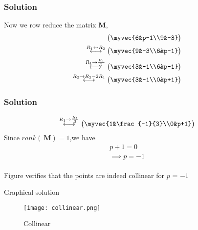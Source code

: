 \documentclass{beamer}
\renewcommand{\vec}[1]{\mathbf{#1}}
\begin{document}
\begin{frame}
\frametitle{Solution}
Now we row reduce the matrix $\vec{M}$,
\begin{align}
\begin{pmatrix}\myvec{6&p-1\\9&-3}
    \end{pmatrix}
    \\
    \overset{R_1\leftrightarrow R_2}{\longleftrightarrow}
\begin{pmatrix}\myvec{9&-3\\6&p-1}\end{pmatrix}
\\
\overset{R_1\rightarrow \frac{R_1}{3}}{\longleftrightarrow}
\begin{pmatrix}\myvec{3&-1\\6&p-1}\end{pmatrix}
\\
\overset{R_2\rightarrow R_2-2R_1}{\longleftrightarrow}
\begin{pmatrix}\myvec{3&-1\\0&p+1}\end{pmatrix}\\
\end{align}
\end{frame}

\begin{frame}
\frametitle{Solution}
\begin{align}
    \overset{R_1\rightarrow \frac{R_1}{3}}{\longleftrightarrow}
\begin{pmatrix}
\myvec{1&\frac{-1}{3}\\0&p+1}
\end{pmatrix}
\end{align}
Since $rank(\
\vec{M})=1$,we have
\begin{align}
 p+1=0 \\
\implies p=-1
 \end{align}\\
 Figure  verifies that the points are indeed collinear for $p$ = $-1$

\end{frame}
\begin{frame}{Graphical solution}   
\begin{figure}[ht]
    \centering
    \texttt{[image: collinear.png]}
    \caption{Collinear}
    \label{Graphical solution}
\end{figure}
\end{frame}
\end{document}
